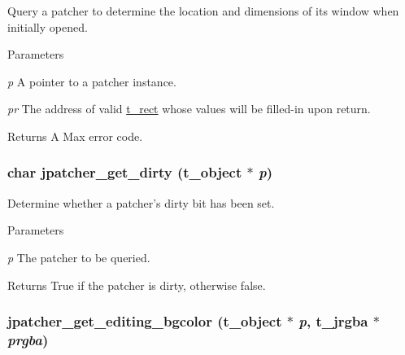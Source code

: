 Query a patcher to determine the location and dimensions of its window when initially opened. 
\begin{DoxyParams}{Parameters}
\item[{\em p}]A pointer to a patcher instance. \item[{\em pr}]The address of valid \hyperlink{structt__rect}{t\_\-rect} whose values will be filled-\/in upon return. \end{DoxyParams}
\begin{DoxyReturn}{Returns}
A Max error code. 
\end{DoxyReturn}
\hypertarget{group__jpatcher_ga5eb01f66882115ca01028ca68c4307b3}{
\subsubsection[{jpatcher\_\-get\_\-dirty}]{\setlength{\rightskip}{0pt plus 5cm}char jpatcher\_\-get\_\-dirty ({\bf t\_\-object} $\ast$ {\em p})}}
\label{group__jpatcher_ga5eb01f66882115ca01028ca68c4307b3}


Determine whether a patcher's dirty bit has been set. 
\begin{DoxyParams}{Parameters}
\item[{\em p}]The patcher to be queried. \end{DoxyParams}
\begin{DoxyReturn}{Returns}
True if the patcher is dirty, otherwise false. 
\end{DoxyReturn}
\hypertarget{group__jpatcher_ga66ac15a412d7fa918471a49e341a93fa}{
\subsubsection[{jpatcher\_\-get\_\-editing\_\-bgcolor}]{ jpatcher\_\-get\_\-editing\_\-bgcolor ({\bf t\_\-object} $\ast$ {\em p}, \/  {\bf t\_\-jrgba} $\ast$ {\em prgba})}}
\label{group__jpatcher_ga66ac15a412d7fa918471a49e341a93fa}


